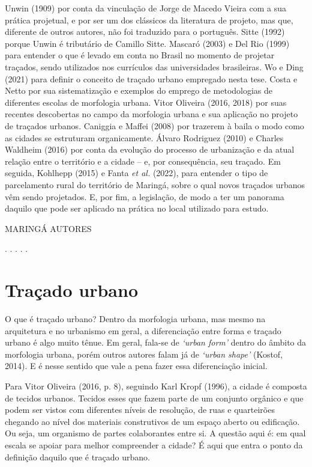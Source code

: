 \documentclass[12pt, a4paper]{book} %
\begin{document}
        Unwin (1909) por conta da vinculação de Jorge de Macedo Vieira com a sua prática projetual, e por ser um dos clássicos da literatura de projeto, mas que, diferente de outros autores, não foi traduzido para o português. Sitte (1992) porque Unwin é tributário de Camillo Sitte. Mascaró (2003) e Del Rio (1999) para entender o que é levado em conta no Brasil no momento de projetar traçados, sendo utilizados nos currículos das universidades brasileiras. Wo e Ding (2021) para definir o conceito de traçado urbano empregado nesta tese. Costa e Netto por sua sistematização e exemplos do emprego de metodologias de diferentes escolas de morfologia urbana. Vitor Oliveira (2016, 2018) por suas recentes descobertas no campo da morfologia urbana e sua aplicação no projeto de traçados urbanos. Caniggia e Maffei (2008) por trazerem à baila o modo como as cidades se estruturam organicamente. Álvaro Rodriguez (2010) e Charles Waldheim (2016) por conta da evolução do processo de urbanização e da atual relação entre o território e a cidade – e, por consequência, seu traçado. Em seguida, Kohlhepp (2015) e Fanta \textit{et al.} (2022), para entender o tipo de parcelamento rural do território de Maringá, sobre o qual novos traçados urbanos vêm sendo projetados. E, por fim, a legislação, de modo a ter um panorama daquilo que pode ser aplicado na prática no local utilizado para estudo.
        
        MARINGÁ AUTORES
    
        \begin{center}
            . . . . .
        \end{center}  
        
            \section{Traçado urbano}%


        O que é traçado urbano? Dentro da morfologia urbana, mas mesmo na arquitetura e no urbanismo em geral, a diferenciação entre forma e traçado urbano é algo muito tênue. Em geral, fala-se de \textit{`urban form'} dentro do âmbito da morfologia urbana, porém outros autores falam já de \textit{`urban shape'} (Kostof, 2014). E é nesse sentido que vale a pena fazer essa diferenciação inicial.

        Para Vitor Oliveira (2016, p. 8), seguindo Karl Kropf (1996), a cidade é composta de tecidos urbanos. Tecidos esses que fazem parte de um conjunto orgânico e que podem ser vistos com diferentes níveis de resolução, de ruas e quarteirões chegando ao nível dos materiais construtivos de um espaço aberto ou edificação. Ou seja, um organismo de partes colaborantes entre si. A questão aqui é: em qual escala se apoiar para melhor compreender a cidade? É aqui que entra o ponto da definição daquilo que é traçado urbano.
\end{document}
